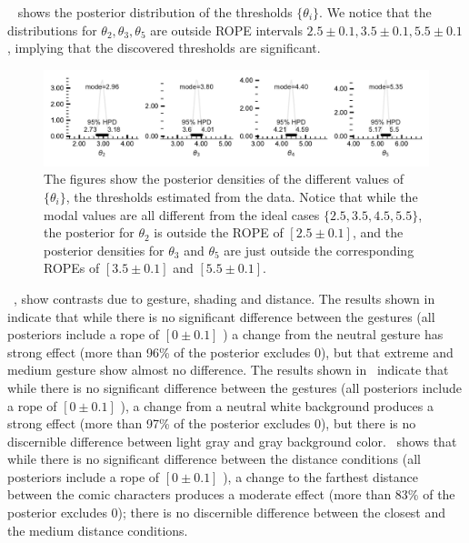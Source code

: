 ~ shows the posterior distribution of the thresholds $\{\theta_i\}$. We notice that the distributions for $\theta_2, \theta_3, \theta_5$ are outside  ROPE intervals $2.5 \pm 0.1, 3.5 \pm 0.1, 5.5 \pm 0.1$, implying that the discovered thresholds are significant.

\begin{figure}
 \includegraphics[width=\textwidth]{./hari-code/factors_theta_values_main-noint.pdf}
 \caption{The figures show the posterior densities of the different values of $\{\theta_i\}$, the thresholds estimated from the data. Notice that while the modal values are all different from the ideal cases $\{2.5, 3.5, 4.5, 5.5\}$, the posterior for $\theta_2$ is outside the ROPE of $[2.5\pm 0.1]$, and the posterior densities for $\theta_3$ and $\theta_5$ are just outside the corresponding ROPEs of $[3.5 \pm 0.1]$ and $[5.5 \pm 0.1]$.}
 \label{fig:theta-main}
\end{figure}

~, show contrasts due to gesture, shading and distance. The results shown in~ indicate that while there is no significant difference between the gestures (all posteriors include a rope of $[0 \pm 0.1]$ ) a change from the neutral gesture has strong effect (more than 96\% of the posterior excludes 0), but that extreme and medium gesture show almost no difference. The results shown in~ indicate that while there  is no significant difference between the gestures (all posteriors include a rope of $[0 \pm 0.1]$ ), a change from a neutral white background produces a strong effect (more than 97\% of the posterior excludes 0), but there is no discernible difference between light gray and gray background color.~ shows that while there  is no significant difference between the distance conditions (all posteriors include a rope of $[0 \pm 0.1]$ ), a change to the farthest distance between the comic characters produces a moderate effect (more than 83\% of the posterior excludes 0); there is no discernible difference between the closest and the medium distance conditions.

